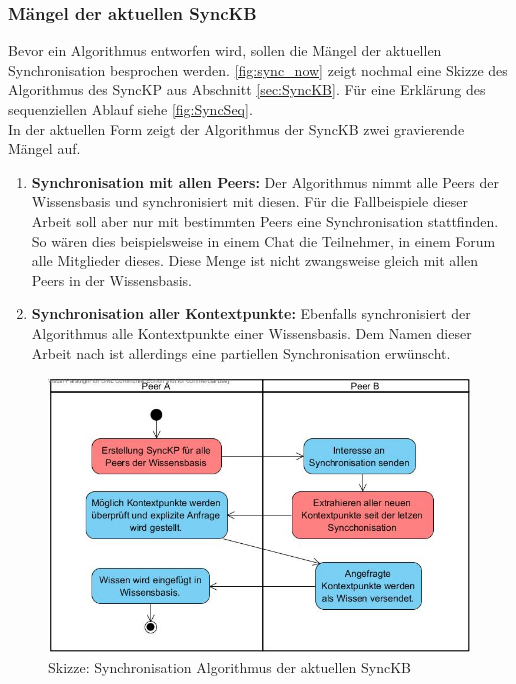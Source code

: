\documentclass[a4paper]{article}
\begin{document}
	\subsubsection{Mängel der aktuellen SyncKB}
	
	Bevor ein Algorithmus entworfen wird, sollen die Mängel der aktuellen 
	Synchronisation besprochen werden. \autoref{fig:sync_now} zeigt nochmal eine
	Skizze des Algorithmus des SyncKP aus Abschnitt \ref{sec:SyncKB}. Für 
	eine Erklärung des sequenziellen Ablauf siehe \autoref{fig:SyncSeq}. \\
	
	In der aktuellen Form zeigt der Algorithmus der SyncKB zwei gravierende Mängel
	auf.
	
	\begin{enumerate}
		\item \textbf{Synchronisation mit allen Peers:} Der Algorithmus nimmt alle
		Peers der Wissensbasis und synchronisiert mit diesen. Für die
		Fallbeispiele dieser Arbeit soll aber nur mit bestimmten Peers eine
		Synchronisation stattfinden. So wären dies beispielsweise in einem Chat die
		Teilnehmer, in einem Forum alle Mitglieder dieses. Diese Menge ist
		nicht zwangsweise gleich mit allen Peers in der Wissensbasis.
		\item \textbf{Synchronisation aller Kontextpunkte:} Ebenfalls
		synchronisiert der Algorithmus alle Kontextpunkte einer Wissensbasis. 
		Dem Namen dieser Arbeit nach ist allerdings eine partiellen Synchronisation
		erwünscht.		
	\end{enumerate}
	
	\begin{figure}[H]
		\includegraphics[width=\linewidth]{../Bilder/sync_flaws.jpg}
		\caption{Skizze: Synchronisation Algorithmus der aktuellen SyncKB}
		\label{fig:sync_now}
	\end{figure}
	
\end{document}
